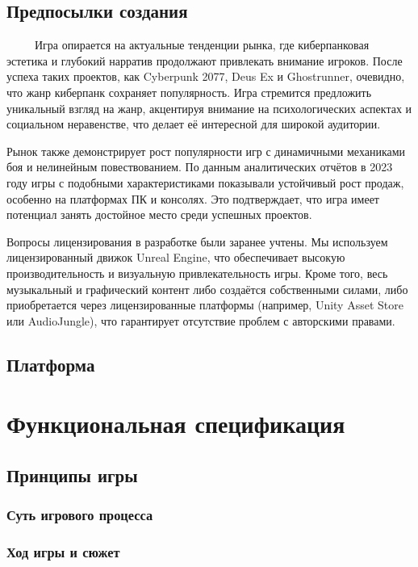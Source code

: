 \documentclass{article}
\begin{document}
\subsection{Предпосылки создания}
\ \ \ \ \ Игра опирается на актуальные тенденции рынка, где киберпанковая эстетика и глубокий нарратив продолжают привлекать внимание игроков. 
После успеха таких проектов, как Cyberpunk 2077, Deus Ex и Ghostrunner, очевидно, что жанр киберпанк сохраняет популярность.
Игра стремится предложить уникальный взгляд на жанр, акцентируя внимание на психологических аспектах и социальном неравенстве, 
что делает её интересной для широкой аудитории.

Рынок также демонстрирует рост популярности игр с динамичными механиками боя и нелинейным повествованием. По данным аналитических отчётов 
в 2023 году игры с подобными характеристиками показывали устойчивый рост продаж, особенно на платформах ПК и консолях. Это подтверждает, 
что игра имеет потенциал занять достойное место среди успешных проектов.

Вопросы лицензирования в разработке были заранее учтены. Мы используем лицензированный движок Unreal Engine, что обеспечивает 
высокую производительность и визуальную привлекательность игры. Кроме того, весь музыкальный и графический контент либо создаётся 
собственными силами, либо приобретается через лицензированные платформы (например, Unity Asset Store или AudioJungle), что гарантирует 
отсутствие проблем с авторскими правами.
\subsection{Платформа}

\section{Функциональная спецификация}

\subsection{Принципы игры}

\subsubsection{Суть игрового процесса}

\subsubsection{Ход игры и сюжет}
\end{document}
